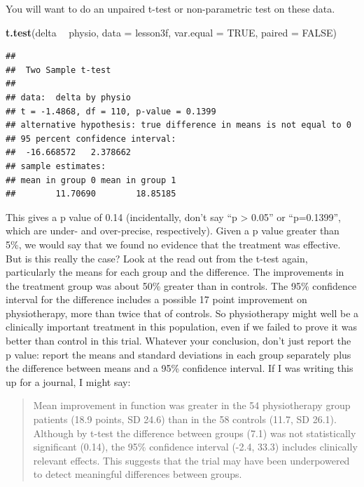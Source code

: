\documentclass[]{book}
\newenvironment{Shaded}{\begin{snugshade}}{\end{snugshade}}
\newcommand{\DataTypeTok}[1]{\textcolor[rgb]{0.13,0.29,0.53}{#1}}
\newcommand{\KeywordTok}[1]{\textcolor[rgb]{0.13,0.29,0.53}{\textbf{#1}}}
\newcommand{\NormalTok}[1]{#1}
\newcommand{\OperatorTok}[1]{\textcolor[rgb]{0.81,0.36,0.00}{\textbf{#1}}}
\newcommand{\OtherTok}[1]{\textcolor[rgb]{0.56,0.35,0.01}{#1}}
\newcommand{\StringTok}[1]{\textcolor[rgb]{0.31,0.60,0.02}{#1}}
\begin{document}
You will want to do an unpaired t-test or non-parametric test on these data.

\begin{Shaded}
\begin{Highlighting}[]
\KeywordTok{t.test}\NormalTok{(delta }\OperatorTok{~}\StringTok{ }\NormalTok{physio, }\DataTypeTok{data =}\NormalTok{ lesson3f, }\DataTypeTok{var.equal =} \OtherTok{TRUE}\NormalTok{, }\DataTypeTok{paired =} \OtherTok{FALSE}\NormalTok{)}
\end{Highlighting}
\end{Shaded}

\begin{verbatim}
## 
##  Two Sample t-test
## 
## data:  delta by physio
## t = -1.4868, df = 110, p-value = 0.1399
## alternative hypothesis: true difference in means is not equal to 0
## 95 percent confidence interval:
##  -16.668572   2.378662
## sample estimates:
## mean in group 0 mean in group 1 
##        11.70690        18.85185
\end{verbatim}

This gives a p value of 0.14 (incidentally, don't say ``p \textgreater{} 0.05'' or ``p=0.1399'', which are under- and over-precise, respectively). Given a p value greater than 5\%, we would say that we found no evidence that the treatment was effective. But is this really the case? Look at the read out from the t-test again, particularly the means for each group and the difference. The improvements in the treatment group was about 50\% greater than in controls. The 95\% confidence interval for the difference includes a possible 17 point improvement on physiotherapy, more than twice that of controls. So physiotherapy might well be a clinically important treatment in this population, even if we failed to prove it was better than control in this trial. Whatever your conclusion, don't just report the p value: report the means and standard deviations in each group separately plus the difference between means and a 95\% confidence interval. If I was writing this up for a journal, I might say:

\begin{quote}
Mean improvement in function was greater in the 54 physiotherapy group patients (18.9 points, SD 24.6) than in the 58 controls (11.7, SD 26.1). Although by t-test the difference between groups (7.1) was not statistically significant (0.14), the 95\% confidence interval (-2.4, 33.3) includes clinically relevant effects. This suggests that the trial may have been underpowered to detect meaningful differences between groups.
\end{quote}
\end{document}
